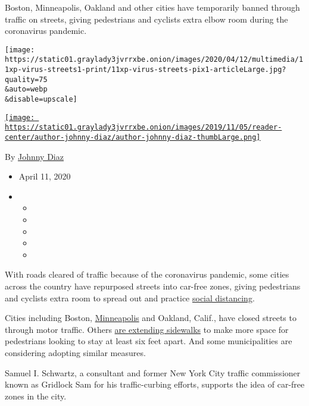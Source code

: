Boston, Minneapolis, Oakland and other cities have temporarily banned
through traffic on streets, giving pedestrians and cyclists extra elbow
room during the coronavirus pandemic.

\texttt{[image: https://static01.graylady3jvrrxbe.onion/images/2020/04/12/multimedia/11xp-virus-streets1-print/11xp-virus-streets-pix1-articleLarge.jpg?quality=75\\\&auto=webp\\\&disable=upscale]}

\href{https://www.nytimes3xbfgragh.onion/by/johnny-diaz}{\texttt{[image: https://static01.graylady3jvrrxbe.onion/images/2019/11/05/reader-center/author-johnny-diaz/author-johnny-diaz-thumbLarge.png]}}

By \href{https://www.nytimes3xbfgragh.onion/by/johnny-diaz}{Johnny Diaz}

\begin{itemize}
\item
  April 11, 2020
\item
  \begin{itemize}
  \item
  \item
  \item
  \item
  \item
  \end{itemize}
\end{itemize}

With roads cleared of traffic because of the coronavirus pandemic, some
cities across the country have repurposed streets into car-free zones,
giving pedestrians and cyclists extra room to spread out and practice
\href{https://www.nytimes3xbfgragh.onion/2020/04/14/us/bishop-gerald-glenn-coronavirus.html}{social
distancing}.

Cities including Boston,
\href{https://www.minneapolisparks.org/news/2020/03/27/minneapolis-park-and-recreation-board-announces-lake-harriet-parkway-and-lake-nokomis-parkway-closures-to-help-trail-users-maintain-social-distancing/}{Minneapolis}
and Oakland, Calif., have closed streets to through motor traffic.
Others
\href{https://twitter.com/BlineTransport/status/1248048199601999875}{are
extending sidewalks} to make more space for pedestrians looking to stay
at least six feet apart. And some municipalities are considering
adopting similar measures.

Samuel I. Schwartz, a consultant and former New York City traffic
commissioner known as Gridlock Sam for his traffic-curbing efforts,
supports the idea of car-free zones in the city.

